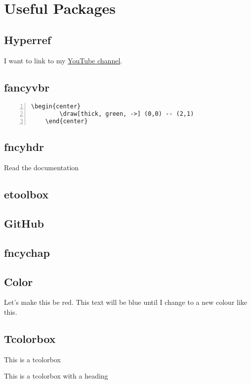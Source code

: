 \chapter{Useful Packages}

\section{Hyperref}
I want to link to my \href{https://www.youtube.com/@DrTrefor}{YouTube channel}.\cite{overleaf-hyperlinks}

\section{fancyvbr}

\begin{Verbatim}[numbers=left, frame=single, formatcom=\color{red}]
    \begin{center}
        \draw[thick, green, ->] (0,0) -- (2,1)
    \end{center}
\end{Verbatim}

\newpage
\section{fncyhdr}
Read the documentation\cite{overleaf-headers}

\section{etoolbox}
\section{GitHub}
\section{fncychap}
\section{Color}
Let's make {\color{red}this} be red. \color{blue} This text will be blue until I change to a new colour like \color{black} this.\cite{overleaf-colours}
\section{Tcolorbox}
\begin{tcolorbox}
    This is a tcolorbox
\end{tcolorbox}
\begin{tcolorbox}[colback=red!5!white,colframe=red!50!black,title=My nice heading]
    This is a tcolorbox with a heading
\end{tcolorbox}

